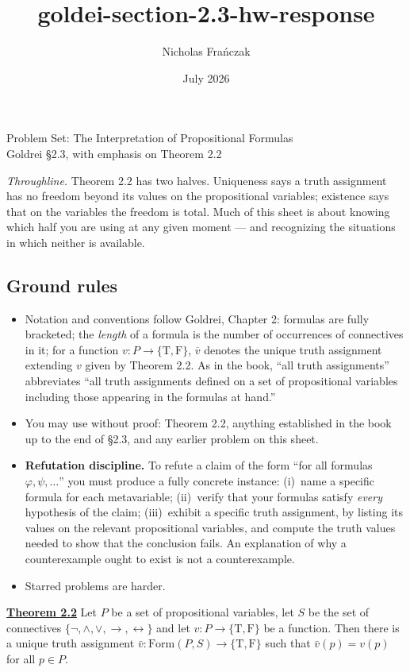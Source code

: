 \documentclass[11pt]{article}
\title{goldei-section-2.3-hw-response}
\author{Nicholas Frańczak}
\date{July 2026}
\newcommand{\Form}{\mathrm{Form}}
\newcommand{\T}{\mathrm{T}}
\newcommand{\F}{\mathrm{F}}
\newcommand{\TF}{\{\T,\F\}}
\newcommand{\ext}[1]{\overline{#1}}
\newcommand{\Sfive}{\{\lnot,\land,\lor,\to,\leftrightarrow\}}
\theoremstyle{definition}
\begin{document}
\begin{center}
{\LARGE Problem Set: The Interpretation of Propositional Formulas}\\[4pt]
{\large Goldrei \S 2.3, with emphasis on Theorem 2.2}
\end{center}

\bigskip

\noindent\emph{Throughline.} Theorem 2.2 has two halves. Uniqueness says a truth
assignment has no freedom beyond its values on the propositional variables;
existence says that on the variables the freedom is total. Much of this sheet is
about knowing which half you are using at any given moment --- and recognizing the
situations in which neither is available.

\subsection*{Ground rules}

\begin{itemize}
\item Notation and conventions follow Goldrei, Chapter 2: formulas are fully
bracketed; the \emph{length} of a formula is the number of occurrences of
connectives in it; for a function $v\colon P\to\TF$, $\ext{v}$ denotes the unique
truth assignment extending $v$ given by Theorem 2.2. As in the book, ``all truth
assignments'' abbreviates ``all truth assignments defined on a set of
propositional variables including those appearing in the formulas at hand.''
\item You may use without proof: Theorem 2.2, anything established in the book up
to the end of \S 2.3, and any earlier problem on this sheet.
\item \textbf{Refutation discipline.} To refute a claim of the form ``for all
formulas $\varphi,\psi,\dots$'' you must produce a fully concrete instance:
(i)~name a specific formula for each metavariable; (ii)~verify that your formulas
satisfy \emph{every} hypothesis of the claim; (iii)~exhibit a specific truth
assignment, by listing its values on the relevant propositional variables, and
compute the truth values needed to show that the conclusion fails. An explanation
of why a counterexample ought to exist is not a counterexample.
\item Starred problems are harder.
\end{itemize}

\noindent\textbf{\underline{Theorem 2.2}}
Let $P$ be a set of propositional variables, let $S$ be the set of connectives $\Sfive$ and let $v\colon P\to\TF$ be a function. Then there is a unique truth assignment $\bar{v}:\Form(P,S)\to\TF$ such that $\bar{v}(p) = v(p)$ for all $p \in P$.
\end{document}
